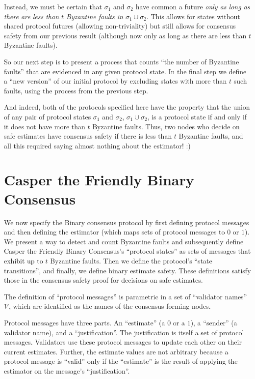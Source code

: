 \documentclass{article}
\theoremstyle{definition}
\begin{document}
Instead, we must be certain that $\sigma_1$ and $\sigma_2$ have common a future \emph{only as long as there are less than $t$ Byzantine faults in $\sigma_1 \cup \sigma_2$}. This allows for states without shared protocol futures (allowing non-triviality) but still allows for consensus safety from our previous result (although now only as long as there are less than $t$ Byzantine faults).

So our next step is to present a process that counts ``the number of Byzantine faults'' that are evidenced in any given protocol state. In the final step we define a ``new version'' of our initial protocol by excluding states with more than $t$ such faults, using the process from the previous step.

And indeed, both of the protocols specified here have the property that the union of any pair of protocol states $\sigma_1$ and $\sigma_2$, $\sigma_1 \cup \sigma_2$, is a protocol state if and only if it does not have more than $t$ Byzantine faults. Thus, two nodes who decide on safe estimates have consensus safety if there is less than $t$ Byzantine faults, and all this required saying almost nothing about the estimator! :)



\section{Casper the Friendly Binary Consensus}

We now specify the Binary consensus protocol by first defining protocol messages and then defining the estimator (which maps sets of protocol messages to $0$ or $1$). We present a way to detect and count Byzantine faults and subsequently define Casper the Friendly Binary Consensus's ``protocol states'' as sets of messages that exhibit up to $t$ Byzantine faults. Then we define the protocol's ``state transitions'', and finally, we define binary estimate safety.  These definitions satisfy those in the consensus safety proof for decisions on safe estimates.

The definition of ``protocol messages'' is parametric in a set of ``validator names'' $\mathcal{V}$, which are identified as the names of the consensus forming nodes.

Protocol messages have three parts. An ``estimate'' (a $0$ or a $1$), a ``sender'' (a validator name), and a ``justification''. The justification is itself a set of protocol messages. Validators use these protocol messages to update each other on their current estimates. Further, the estimate values are not arbitrary because a protocol message is ``valid'' only if the ``estimate'' is the result of applying the estimator on the message's ``justification''.
\end{document}
